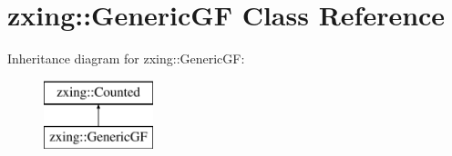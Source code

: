 \hypertarget{classzxing_1_1_generic_g_f}{}\section{zxing\+:\+:Generic\+GF Class Reference}
\label{classzxing_1_1_generic_g_f}
Inheritance diagram for zxing\+:\+:Generic\+GF\+:\begin{figure}[H]
\begin{center}
\leavevmode
\includegraphics[height=2.000000cm]{classzxing_1_1_generic_g_f}
\end{center}
\end{figure}
